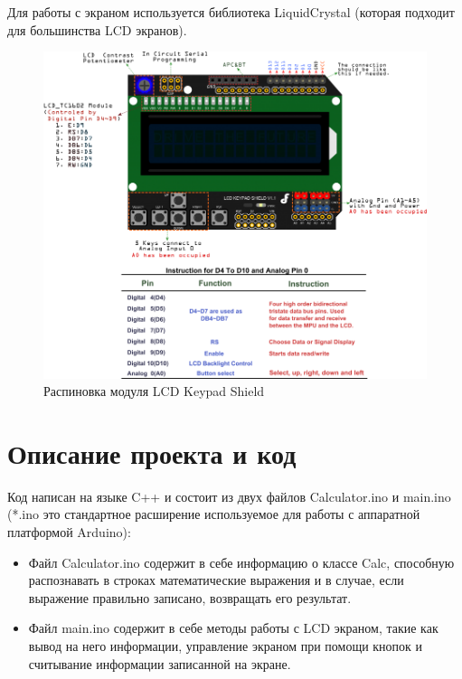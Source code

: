 \documentclass[a4paper, 12pt]{article}%
\begin{document}
Для работы с экраном используется библиотека LiquidCrystal (которая подходит для большинства LCD экранов).

\newpage

\begin{figure}[h!]
\centering
\includegraphics[scale=0.4]{images/900px-DFR0009-PIN2.png}
\caption{Распиновка модуля LCD Keypad Shield}
\label{900px-DFR0009-PIN2}
\end{figure}

\newpage

\section{Описание проекта и код}

Код написан на языке C++ и состоит из двух файлов Calculator.ino и main.ino (*.ino это стандартное расширение используемое для работы с аппаратной платформой Arduino):

\begin{itemize}
\item Файл Calculator.ino содержит в себе информацию о классе Calc, способную распознавать в строках математические выражения и в случае, если выражение правильно записано, возвращать его результат.

\item Файл main.ino содержит в себе методы работы с LCD экраном, такие как вывод на него информации, управление экраном при помощи кнопок и считывание информации записанной на экране.
\end{itemize}
\end{document}
